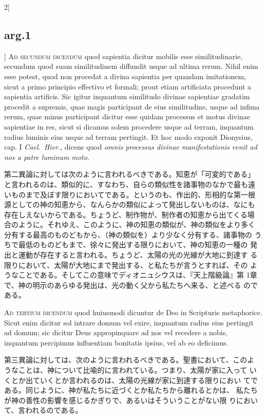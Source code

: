 \documentclass[paper=a4paper,fontsize=10pt,jafontsize=9pt,titlepage]{jlreq}
\begin{document}
\begin{paracol}{2}[\subsection{arg.1}]
{\scshape Ad secundum dicendum} quod sapientia dicitur mobilis esse
similitudinarie, secundum quod suam similitudinem diffundit usque ad
ultima rerum. Nihil enim esse potest, quod non procedat a divina
sapientia per quandam imitationem, sicut a primo principio effectivo
et formali; prout etiam artificiata procedunt a sapientia
artificis. Sic igitur inquantum similitudo divinae sapientiae gradatim
procedit a supremis, quae magis participant de eius similitudine,
usque ad infima rerum, quae minus participant dicitur esse quidam
processus et motus divinae sapientiae in res, sicut si dicamus solem
procedere usque ad terram, inquantum radius luminis eius usque ad
terram pertingit. Et hoc modo exponit Dionysius, cap. I {\itshape
Cael.~Hier.}, dicens quod {\itshape omnis processus divinae
manifestationis venit ad nos a patre luminum moto}.

\switchcolumn

第二異論に対しては次のように言われるべきである。知恵が「可変的である」
と言われるのは、類似的に、すなわち、自らの類似性を諸事物のなかで最も遠
いものまで及ぼす限りにおいてである。というのも、作出的、形相的な第一根
源としての神の知恵から、なんらかの類似によって発出しないものは、なにも
存在しえないからである。ちょうど、制作物が、制作者の知恵から出てくる場
合のように。それゆえ、このように、神の知恵の類似が、神の類似をより多く
分有する最高のものどもから、（神の類似を）より少なく分有する、諸事物の
うちで最低のものどもまで、徐々に発出する限りにおいて、神の知恵の一種の
発出と運動が存在すると言われる。ちょうど、太陽の光の光線が大地に到達す
る限りにおいて、太陽が大地にまで発出する、と私たちが言うとすれば、その
ようなことである。そしてこの意味でディオニュシウスは、『天上階級論』第
1章で、神の明示のあらゆる発出は、光の動く父から私たちへ来る、と述べる
のである。

\switchcolumn*[\subsection{ad.3}]

{\scshape Ad tertium dicendum} quod huiusmodi dicuntur de Deo in
 Scripturis metaphorice. Sicut enim dicitur sol intrare domum vel exire,
 inquantum radius eius pertingit ad domum; sic dicitur Deus
 appropinquare ad nos vel recedere a nobis, inquantum percipimus
 influentiam bonitatis ipsius, vel ab eo deficimus.

\switchcolumn

第三異論に対しては、次のように言われるべきである。聖書において、このよ
 うなことは、神について比喩的に言われている。つまり、太陽が家に入って
 いくとか出ていくとか言われるのは、太陽の光線が家に到達する限りにおい
 てである。同じように、神が私たちに近づくとか私たちから離れるとかは、
 私たちが神の善性の影響を感じるかぎりで、あるいはそういうことがない限
 りにおいて、言われるのである。

\end{paracol}
\newpage
{}
\end{document}
